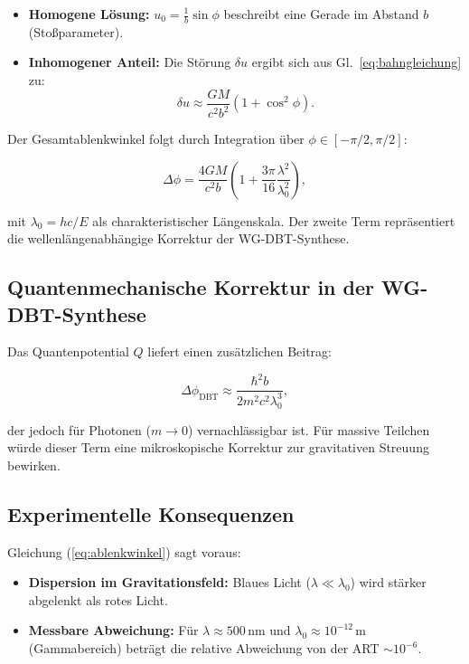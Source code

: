 \begin{itemize}
\item \textbf{Homogene Lösung:} $u_0 = \frac{1}{b} \sin \phi$ beschreibt eine Gerade im Abstand $b$ (Stoßparameter).
\item \textbf{Inhomogener Anteil:} Die Störung $\delta u$ ergibt sich aus Gl.~\ref{eq:bahngleichung} zu:
\begin{equation}
\delta u \approx \frac{GM}{c^2 b^2} (1 + \cos^2 \phi).
\end{equation}
\end{itemize}

Der Gesamtablenkwinkel folgt durch Integration über $\phi \in [-\pi/2, \pi/2]$:

\begin{equation}
\Delta \phi = \frac{4GM}{c^2 b} \left(1 + \frac{3\pi}{16} \frac{\lambda^2}{\lambda_0^2}\right),
\label{eq:ablenkwinkel}
\end{equation}

mit $\lambda_0 = hc/E$ als charakteristischer Längenskala. Der zweite Term repräsentiert die wellenlängenabhängige Korrektur der WG-DBT-Synthese.

\subsection{Quantenmechanische Korrektur in der WG-DBT-Synthese}
Das Quantenpotential $Q$ liefert einen zusätzlichen Beitrag:

\begin{equation}
\Delta \phi_{\text{DBT}} \approx \frac{\hbar^2 b}{2m^2 c^2 \lambda_0^3},
\end{equation}

der jedoch für Photonen ($m \to 0$) vernachlässigbar ist. Für massive Teilchen würde dieser Term eine mikroskopische Korrektur zur gravitativen Streuung bewirken.

\subsection{Experimentelle Konsequenzen}
Gleichung (\ref{eq:ablenkwinkel}) sagt voraus:
\begin{itemize}
\item \textbf{Dispersion im Gravitationsfeld:} Blaues Licht ($\lambda \ll \lambda_0$) wird stärker abgelenkt als rotes Licht.
\item \textbf{Messbare Abweichung:} Für $\lambda \approx 500\,\text{nm}$ und $\lambda_0 \approx 10^{-12}\,\text{m}$ (Gammabereich) beträgt die relative Abweichung von der ART $\sim 10^{-6}$.
\end{itemize}

